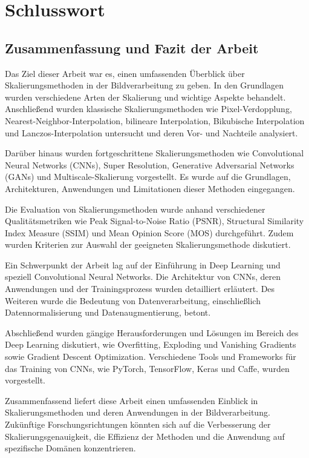 \chapter{Schlusswort}

\section{Zusammenfassung und Fazit der Arbeit}

Das Ziel dieser Arbeit war es, einen umfassenden Überblick über Skalierungsmethoden in der Bildverarbeitung zu geben.
In den Grundlagen wurden verschiedene Arten der Skalierung und wichtige Aspekte behandelt. Anschließend wurden klassische Skalierungsmethoden wie Pixel-Verdopplung, Nearest-Neighbor-Interpolation, bilineare Interpolation, Bikubische Interpolation und Lanczos-Interpolation untersucht und deren Vor- und Nachteile analysiert.

Darüber hinaus wurden fortgeschrittene Skalierungsmethoden wie Convolutional Neural Networks (CNNs), Super Resolution, Generative Adversarial Networks (GANs) und Multiscale-Skalierung vorgestellt.
Es wurde auf die Grundlagen, Architekturen, Anwendungen und Limitationen dieser Methoden eingegangen.

Die Evaluation von Skalierungsmethoden wurde anhand verschiedener Qualitätsmetriken wie Peak Signal-to-Noise Ratio (PSNR), Structural Similarity Index Measure (SSIM) und Mean Opinion Score (MOS) durchgeführt.
Zudem wurden Kriterien zur Auswahl der geeigneten Skalierungsmethode diskutiert.

Ein Schwerpunkt der Arbeit lag auf der Einführung in Deep Learning und speziell Convolutional Neural Networks.
Die Architektur von CNNs, deren Anwendungen und der Trainingsprozess wurden detailliert erläutert.
Des Weiteren wurde die Bedeutung von Datenverarbeitung, einschließlich Datennormalisierung und Datenaugmentierung, betont.

Abschließend wurden gängige Herausforderungen und Lösungen im Bereich des Deep Learning diskutiert, wie Overfitting, Exploding und Vanishing Gradients sowie Gradient Descent Optimization.
Verschiedene Tools und Frameworks für das Training von CNNs, wie PyTorch, TensorFlow, Keras und Caffe, wurden vorgestellt.

Zusammenfassend liefert diese Arbeit einen umfassenden Einblick in Skalierungsmethoden und deren Anwendungen in der Bildverarbeitung.
Zukünftige Forschungsrichtungen könnten sich auf die Verbesserung der Skalierungsgenauigkeit, die Effizienz der Methoden und die Anwendung auf spezifische Domänen konzentrieren.

